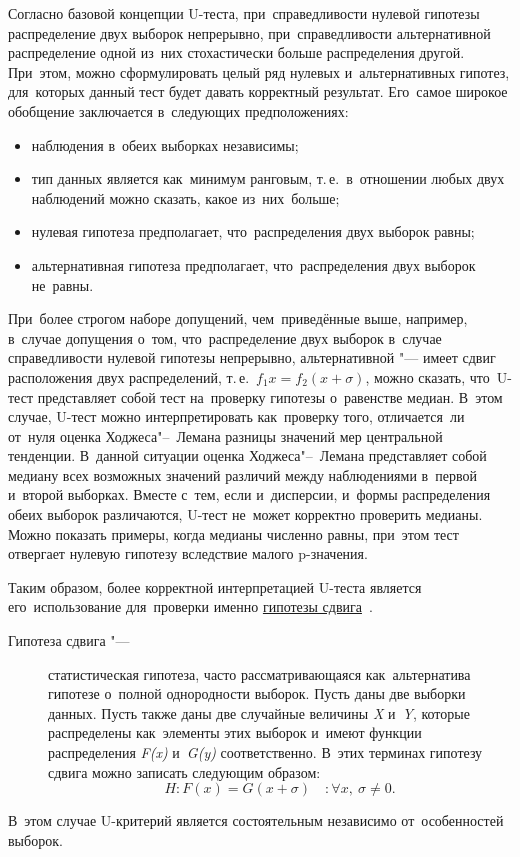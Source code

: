\documentclass[]{scrartcl}
\begin{document}
Согласно базовой концепции U-теста, при~справедливости нулевой гипотезы распределение двух выборок непрерывно, при~справедливости альтернативной распределение одной из~них стохастически больше распределения другой. При~этом, можно сформулировать целый ряд нулевых и~альтернативных гипотез, для~которых данный тест будет давать корректный результат. Его~самое широкое обобщение заключается в~следующих предположениях:
\begin{itemize}
	\item наблюдения в~обеих выборках независимы;
	\item тип данных является как~минимум ранговым, т.\,е.~в~отношении любых двух наблюдений можно сказать, какое из~них~больше;
	\item нулевая гипотеза предполагает, что~распределения двух выборок равны;
	\item альтернативная гипотеза предполагает, что~распределения двух выборок не~равны.
\end{itemize}
При~более строгом наборе допущений, чем~приведённые выше, например, в~случае допущения о~том, что~распределение двух выборок в~случае справедливости нулевой гипотезы непрерывно, альтернативной "--- имеет сдвиг расположения двух распределений, т.\,е.~$f_{1}{x}=f_{2}(x+\sigma)$, можно сказать, что~U-тест представляет собой тест на~проверку гипотезы о~равенстве медиан. В~этом случае, U-тест можно интерпретировать как~проверку того, отличается~ли от~нуля оценка Ходжеса"--~Лемана разницы значений мер центральной тенденции. В~данной ситуации оценка Ходжеса"--~Лемана представляет собой медиану всех возможных значений различий между наблюдениями в~первой и~второй выборках. Вместе с~тем, если и~дисперсии, и~формы распределения обеих выборок различаются, U-тест не~может корректно проверить медианы. Можно показать примеры, когда медианы численно равны, при~этом тест отвергает нулевую гипотезу вследствие малого p-значения.

Таким образом, более корректной интерпретацией U-теста является его~использование для~проверки именно \href{http://www.machinelearning.ru/wiki/index.php?title=Гипотеза_сдвига}{гипотезы сдвига}~\cite{MLRU:shift-hypothesis}.
\begin{description}
	\item[Гипотеза сдвига "---] статистическая гипотеза, часто рассматривающаяся как~альтернатива гипотезе о~полной однородности выборок. Пусть даны две выборки данных. Пусть также даны две случайные величины \textit{X} и~\textit{Y}, которые распределены как~элементы этих выборок и~имеют функции распределения \textit{F(x)} и~\textit{G(y)} соответственно. В~этих терминах гипотезу сдвига можно записать следующим образом: 
	\begin{equation}
		H:F(x)=G(x+\sigma) \quad: \forall x,\ \sigma \neq 0.
	\end{equation}
\end{description}
В~этом случае U-критерий является состоятельным независимо от~особенностей выборок.
\end{document}
